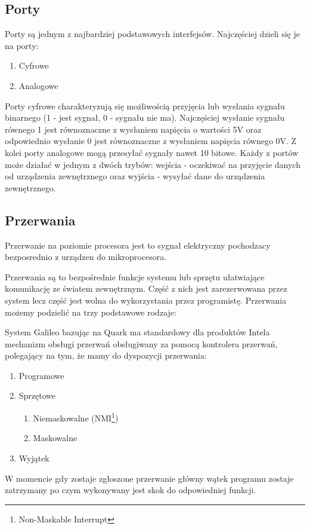 \documentclass{xmgr}
\begin{document}
\subsection{Porty}
Porty są jednym z najbardziej podstawowych interfejsów. Najczęściej dzieli się je na porty:
\begin{enumerate}
	\item Cyfrowe
	\item Analogowe
\end{enumerate}

Porty cyfrowe charakteryzują się możliwością przyjęcia lub wysłania sygnału binarnego (1 - jest sygnał, 0 - sygnału nie ma). Najczęściej wysłanie sygnału równego 1 jest równoznaczne z wysłaniem napięcia o wartości 5V oraz odpowiednio wysłanie 0 jest równoznaczne z wysłaniem napięcia równego 0V. Z kolei porty analogowe mogą przesyłać sygnały nawet 10 bitowe. Każdy z portów może działać w jednym  z dwóch trybów: wejścia - oczekiwać na przyjęcie danych od urządzenia zewnętrznego oraz wyjścia - wysyłać dane do urządzenia zewnętrznego.

\subsection{Przerwania}

Przerwanie na poziomie procesora jest to sygnał elektryczny pochodzacy bezposrednio z urządzen do mikroprocesora.

Przerwania są to bezpośrednie funkcje systemu lub sprzętu ułatwiające komunikację ze światem zewnętrznym. Część z nich jest zarezerwowana przez system lecz część jest wolna do wykorzystania przez programistę. Przerwania możemy podzielić na trzy podstawowe rodzaje:

System Galileo bazując na Quark ma standardowy dla produktów Intela mechanizm obsługi przerwań obsługiwany za pomocą kontrolera przerwań, polegający na tym, że mamy do dyspozycji przerwania:
\begin{enumerate}
	\item Programowe
	\item Sprzętowe
	\begin{enumerate}
		\item Niemaskowalne (NMI\footnote{Non-Maskable Interrupt})
		\item Maskowalne
	\end{enumerate}
	\item Wyjątek
\end{enumerate}

W momencie gdy zostaje zgłoszone przerwanie główny wątek programu zostaje zatrzymany po czym wykonywany jest skok do odpowiedniej funkcji.
\end{document}

